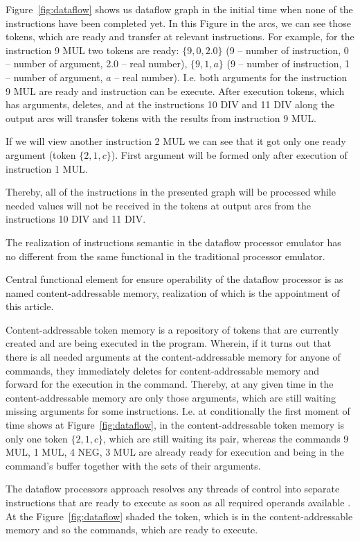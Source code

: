 \documentclass[
11pt,%
tightenlines,%
twoside,%
onecolumn,%
nofloats,%
nobibnotes,%
nofootinbib,%
superscriptaddress,%
noshowpacs,%
centertags]%
{revtex4}
\begin{document}
Figure~\ref{fig:dataflow} shows us dataflow graph in the initial time when none of the instructions have been completed yet. In this Figure in the arcs, we can see those tokens, which are ready and transfer at relevant instructions. For example, for the instruction 9 MUL two tokens are ready: $\{9, 0, 2.0\}$ (9 -- number of instruction, 0 -- number of argument, 2.0 -- real number), $\{9, 1, a\}$ (9 -- number of instruction, 1 -- number of argument, $a$ -- real number). I.e. both arguments for the instruction 9 MUL are ready and instruction can be execute. After execution tokens, which has arguments, deletes, and at the instructions 10 DIV and 11 DIV along the output arcs will transfer tokens with the results from instruction 9 MUL.

If we will view another instruction 2 MUL we can see that it got only one ready argument (token $\{2, 1, c\}$). First argument will be formed only after execution of instruction 1 MUL.

Thereby, all of the instructions in the presented graph will be processed while needed values will not be received in the tokens at output arcs from the instructions 10 DIV and 11 DIV.

The realization of instructions semantic in the dataflow processor emulator has no different from the same functional in the traditional processor emulator.

Central functional element for ensure operability of the dataflow processor is as named content-addressable memory, realization of which is the appointment of this article.

Content-addressable token memory is a repository of tokens that are currently created and are being executed in the program. Wherein, if it turns out that there is all needed arguments at the content-addressable memory for anyone of commands, they immediately deletes for content-addressable memory and forward for the execution in the command. Thereby, at any given time in the content-addressable memory are only those arguments, which are still waiting missing arguments for some instructions. I.e. at conditionally the first moment of time shows at Figure~\ref{fig:dataflow}, in the content-addressable token memory is only one token $\{2, 1, c\}$, which are still waiting its pair, whereas the commands 9 MUL, 1 MUL, 4 NEG, 3 MUL are already ready for execution and being in the command’s buffer together with the sets of their arguments.

The dataflow processors approach resolves any threads of control into separate instructions that are ready to execute as soon as all required operands available \cite{silc}. 
At the Figure~\ref{fig:dataflow} shaded the token, which is in the content-addressable memory and so the commands, which are ready to execute.
\end{document}
